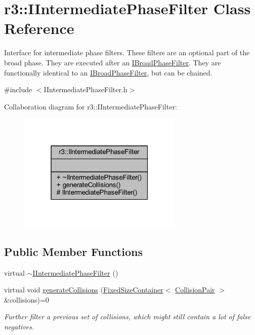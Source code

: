 \hypertarget{classr3_1_1_i_intermediate_phase_filter}{}\section{r3\+:\+:I\+Intermediate\+Phase\+Filter Class Reference}
\label{classr3_1_1_i_intermediate_phase_filter}


Interface for intermediate phase filters. These filters are an optional part of the broad phase. They are executed after an \mbox{\hyperlink{classr3_1_1_i_broad_phase_filter}{I\+Broad\+Phase\+Filter}}. They are functionally identical to an \mbox{\hyperlink{classr3_1_1_i_broad_phase_filter}{I\+Broad\+Phase\+Filter}}, but can be chained.  




{\ttfamily \#include $<$I\+Intermediate\+Phase\+Filter.\+h$>$}



Collaboration diagram for r3\+:\+:I\+Intermediate\+Phase\+Filter\+:\nopagebreak
\begin{figure}[H]
\begin{center}
\leavevmode
\includegraphics[width=223pt]{classr3_1_1_i_intermediate_phase_filter__coll__graph}
\end{center}
\end{figure}
\subsection*{Public Member Functions}
\begin{DoxyCompactItemize}
\item 
virtual \mbox{\hyperlink{classr3_1_1_i_intermediate_phase_filter_ab2257ec90263c444371f455078e5ff7c}{$\sim$\+I\+Intermediate\+Phase\+Filter}} ()
\item 
virtual void \mbox{\hyperlink{classr3_1_1_i_intermediate_phase_filter_a0b235161317095e134661aa49beb909d}{generate\+Collisions}} (\mbox{\hyperlink{classr3_1_1_fixed_size_container}{Fixed\+Size\+Container}}$<$ \mbox{\hyperlink{classr3_1_1_collision_pair}{Collision\+Pair}} $>$ \&collisions)=0
\begin{DoxyCompactList}\small\item\em Further filter a previous set of collisions, which might still contain a lot of false negatives. \end{DoxyCompactList}\end{DoxyCompactItemize}
